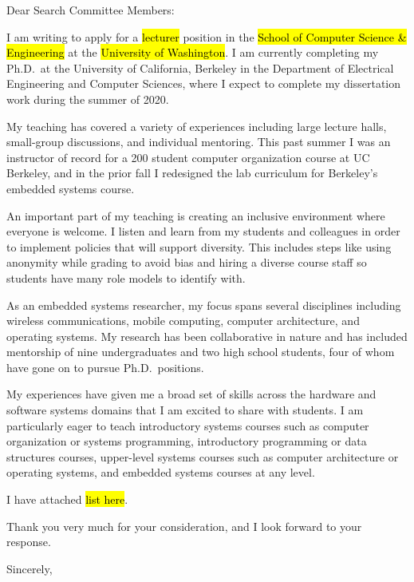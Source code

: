 \documentclass{letter}
\begin{document}
\begin{letter}{}
\date{}

\opening{Dear Search Committee Members:}

I am writing to apply for a
\hl{lecturer}
position in the
\hl{School of Computer Science \& Engineering}
at the
\hl{University of Washington}.
%
I am currently completing my Ph.D.\ at the University of California, Berkeley
in the Department of Electrical Engineering and Computer Sciences, where I
expect to complete my dissertation work during the summer of 2020.

My teaching has covered a variety of experiences including
large lecture halls, small-group discussions, and individual mentoring.
%
This past summer I was an instructor of record for a 200 student computer
organization course at UC Berkeley, and in the prior fall I redesigned the lab
curriculum for Berkeley's embedded systems course.

An important part of my teaching is creating an inclusive environment where
everyone is welcome. I listen and learn from my students and colleagues
in order to implement policies that will support diversity.
%
This includes steps like using anonymity while grading to avoid bias and hiring
a diverse course staff so students have many role models to identify with.

As an embedded systems researcher, my focus spans several disciplines including
wireless communications, mobile computing, computer architecture, and operating
systems.
%
My research has been collaborative in nature and has included mentorship of
nine undergraduates and two high school students, four of whom have gone on to
pursue Ph.D.\ positions.

My experiences have given me a broad set of skills across the hardware and
software systems domains that I am excited to share with students.
%
I am particularly eager to teach
introductory systems courses such as computer organization or systems programming,
introductory programming or data structures courses,
upper-level systems courses such as computer architecture or operating systems,
and embedded systems courses at any level.
%


I have attached
\hl{list here}.

Thank you very much for your consideration, and I look forward to your response.

\closing{Sincerely,}

\end{letter}
\end{document}

